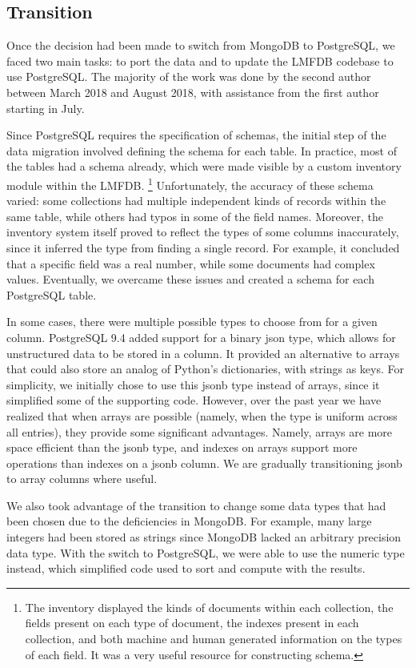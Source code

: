 \documentclass{article}
\begin{document}
\subsection{Transition}

Once the decision had been made to switch from MongoDB to PostgreSQL, we faced two main tasks: to port the data and to update the LMFDB codebase to use PostgreSQL.
The majority of the work was done by the second author between March 2018 and August 2018, with assistance from the first author starting in July.

Since PostgreSQL requires the specification of schemas, the initial step of the data migration involved defining the schema for each table.
In practice, most of the tables had a schema already, which were made visible by a custom inventory module within the LMFDB.%
\footnote{The inventory displayed the kinds of documents within each collection, the fields present on each type of document, the indexes present in each collection, and both machine and human generated information on the types of each field.
It was a very useful resource for constructing schema.}
Unfortunately, the accuracy of these schema varied: some collections had multiple independent kinds of records within the same table, while others had typos in some of the field names.
Moreover, the inventory system itself proved to reflect the types of some columns inaccurately, since it inferred the type from finding a single record.
For example, it concluded that a specific field was a real number, while some documents had complex values.
Eventually, we overcame these issues and created a schema for each PostgreSQL table.

In some cases, there were multiple possible types to choose from for a given column.
PostgreSQL 9.4 added support for a binary json type, which allows for unstructured data to be stored in a column.
It provided an alternative to arrays that could also store an analog of Python's dictionaries, with strings as keys.
For simplicity, we initially chose to use this jsonb type instead of arrays, since it simplified some of the supporting code.
However, over the past year we have realized that when arrays are possible (namely, when the type is uniform across all entries), they provide some significant advantages.
Namely, arrays are more space efficient than the jsonb type, and indexes on arrays support more operations than indexes on a jsonb column.
We are gradually transitioning jsonb to array columns where useful.

We also took advantage of the transition to change some data types that had been chosen due to the deficiencies in MongoDB.
For example, many large integers had been stored as strings since MongoDB lacked an arbitrary precision data type.
With the switch to PostgreSQL, we were able to use the numeric type instead, which simplified code used to sort and compute with the results.
\end{document}

